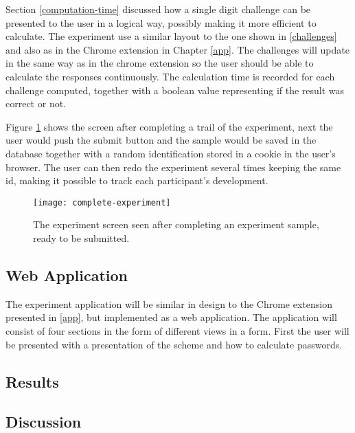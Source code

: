 \par Section \ref{computation-time} discussed how a single digit challenge can be presented to the user in a logical way, possibly making it more efficient to calculate. The experiment use a similar layout to the one shown in \autoref{challenges} and also as in the Chrome extension in Chapter \ref{app}. The challenges will update in the same way as in the chrome extension so the user should be able to calculate the responses continuously. The calculation time is recorded for each challenge computed, together with a boolean value representing if the result was correct or not. 
\par Figure \ref{complete-experiment} shows the screen after completing a trail of the experiment, next the user would push the submit button and the sample would be saved in the database together with a random identification stored in a cookie in the user's browser. The user can then redo the experiment several times keeping the same id, making it possible to track each participant's development.

\begin{figure}[h]
    \texttt{[image: complete-experiment]}
    \caption{The experiment screen seen after completing an experiment sample, ready to be submitted.}
    \label{complete-experiment}
\end{figure}

\subsection{Web Application}
The experiment application will be similar in design to the Chrome extension presented in \autoref{app}, but implemented as a web application. The application will consist of four sections in the form of different views in a form. First the user will be presented with a presentation of the scheme and how to calculate passwords.


\subsection{Results}

\subsection{Discussion}
\todo[inline]{}
